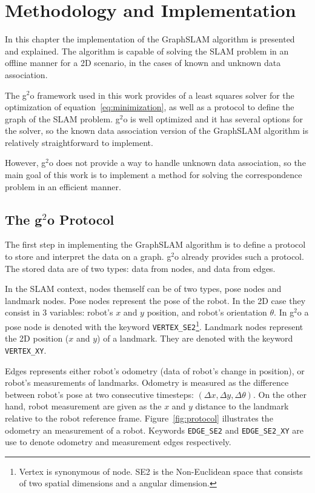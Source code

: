 \chapter{Methodology and Implementation}
\label{chap:implementation}
 
In this chapter the implementation of the GraphSLAM algorithm is presented and explained. The algorithm is capable of solving the SLAM problem in an offline manner for a 2D scenario, in the cases of known and unknown data association.

The g$^2$o framework used in this work provides of a least squares solver for the optimization of equation~\eqref{eq:minimization}, as well as a protocol to define the graph of the SLAM problem. g$^2$o is well optimized and it has several options for the solver, so the known data association version of the GraphSLAM algorithm is relatively straightforward to implement.

However, g$^2$o does not provide a way to handle unknown data association, so the main goal of this work is to implement a method for solving the correspondence problem in an efficient manner.

\section{The g$^2$o Protocol}

The first step in implementing the GraphSLAM algorithm is to define a protocol to store and interpret the data on a graph. g$^2$o already provides such a protocol. The stored data are of two types: data from nodes, and data from edges. 

In the SLAM context, nodes themself can be of two types, pose nodes and landmark nodes. Pose nodes represent the pose of the robot. In the 2D case they consist in 3 variables: robot's $x$ and $y$ position, and robot's orientation $\theta$. In g$^2$o a pose node is denoted with the keyword \texttt{VERTEX\_SE2}\footnote{Vertex is synonymous of node. SE2 is the Non-Euclidean space that consists of two spatial dimensions and a angular dimension.}. Landmark nodes represent the 2D position ($x$ and $y$) of a landmark. They are denoted with the keyword \texttt{VERTEX\_XY}.

Edges represents either robot's odometry (data of robot's change in position), or robot's measurements of landmarks. Odometry is measured as the difference between robot's pose at two consecutive timesteps: $(\Delta x, \Delta y, \Delta \theta)$. On the other hand, robot measurement are given as the $x$ and $y$ distance to the landmark relative to the robot reference frame. Figure~\ref{fig:protocol} illustrates the odometry an measurement of a robot. Keywords \texttt{EDGE\_SE2} and \texttt{EDGE\_SE2\_XY} are use to denote odometry and measurement edges respectively.

